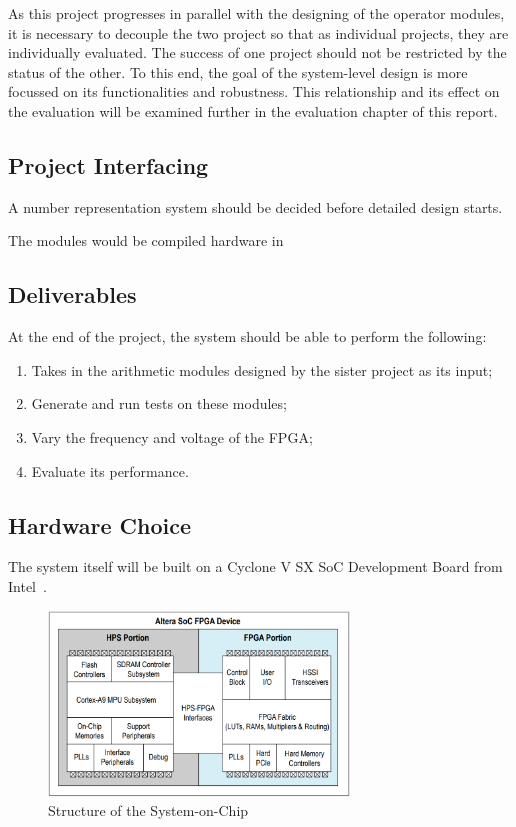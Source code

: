 \documentclass[journal]{IEEEtran}
\begin{document}
As this project progresses in parallel with the designing of the operator
modules, it is necessary to decouple the two project so that as individual
projects, they are individually evaluated.
The success of one project should not be restricted by the status of the other.
To this end, the goal of the system-level design is more focussed on its
functionalities and robustness.
This relationship and its effect on the evaluation will be examined further in
the evaluation chapter of this report.

\subsection{Project Interfacing}
A number representation system should be decided before detailed design starts.

The modules would be compiled hardware in 

\subsection{Deliverables}
At the end of the project, the system should be able to perform the following:
\begin{enumerate}
  \item Takes in the arithmetic modules designed by the sister project as its
        input;
  \item Generate and run tests on these modules;
  \item Vary the frequency and voltage of the FPGA;
  \item Evaluate its performance.
\end{enumerate}

\subsection{Hardware Choice}
The system itself will be built on a Cyclone V SX SoC Development Board from
Intel~\cite{Cy5DBWeb}.

\begin{figure}[H]
  \centering
  \includegraphics[width=8cm]{img/SoCStructure}
  \caption{Structure of the System-on-Chip}
  \label{SoCStructure}
\end{figure}
\end{document}
